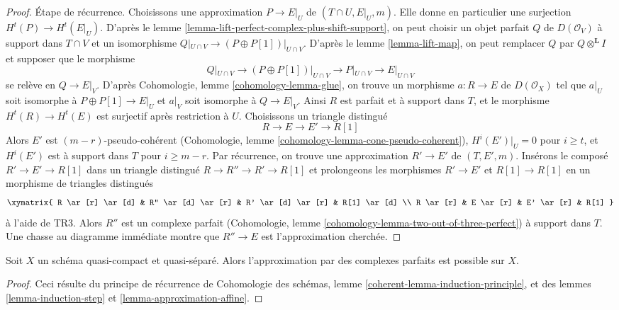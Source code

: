 \begin{proof}
\medskip\noindent
Étape de récurrence. Choisissons une approximation $P \to E|_U$
de $(T \cap U, E|_U, m)$. Elle donne en particulier une surjection
$H^t(P) \to H^t(E|_U)$. D'après le
lemme \ref{lemma-lift-perfect-complex-plus-shift-support},
on peut choisir un objet parfait $Q$ de $D(\mathcal{O}_V)$
à support dans $T \cap V$ et un isomorphisme
$Q|_{U \cap V} \to (P \oplus P[1])|_{U \cap V}$.
D'après le lemme \ref{lemma-lift-map}, on peut remplacer $Q$ par
$Q \otimes^\mathbf{L} I$
et supposer que le morphisme
$$
Q|_{U \cap V} \to (P \oplus P[1])|_{U \cap V}
\longrightarrow P|_{U \cap V}
\longrightarrow
E|_{U \cap V}
$$
se relève en $Q \to E|_V$. D'après
Cohomologie, lemme \ref{cohomology-lemma-glue},
on trouve un morphisme $a : R \to E$ de $D(\mathcal{O}_X)$
tel que $a|_U$ soit isomorphe à $P \oplus P[1] \to E|_U$
et $a|_V$ soit isomorphe à $Q \to E|_V$.
Ainsi $R$ est parfait et à support dans $T$,
et le morphisme $H^t(R) \to H^t(E)$ est surjectif après restriction à $U$.
Choisissons un triangle distingué
$$
R \to E \to E' \to R[1]
$$
Alors $E'$ est $(m - r)$-pseudo-cohérent
(Cohomologie, lemme \ref{cohomology-lemma-cone-pseudo-coherent}),
$H^i(E')|_U = 0$ pour $i \geq t$, et
$H^i(E')$ est à support dans $T$ pour $i \geq m - r$.
Par récurrence, on trouve une approximation $R' \to E'$
de $(T, E', m)$. Insérons le composé $R' \to E' \to R[1]$
dans un triangle distingué $R \to R'' \to R' \to R[1]$
et prolongeons les morphismes $R' \to E'$ et $R[1] \to R[1]$ en
un morphisme de triangles distingués
$$
\xymatrix{
R \ar[r] \ar[d] & R'' \ar[d] \ar[r] & R' \ar[d] \ar[r] & R[1] \ar[d] \\
R \ar[r] &  E \ar[r] & E' \ar[r] & R[1]
}
$$
à l'aide de TR3. Alors $R''$ est un complexe parfait
(Cohomologie, lemme \ref{cohomology-lemma-two-out-of-three-perfect})
à support dans $T$.
Une chasse au diagramme immédiate montre que $R'' \to E$ est l'approximation
cherchée.
\end{proof}

\begin{theorem}
\label{theorem-approximation}
Soit $X$ un schéma quasi-compact et quasi-séparé.
Alors l'approximation par des complexes parfaits est possible sur $X$.
\end{theorem}

\begin{proof}
Ceci résulte du principe de récurrence de
Cohomologie des schémas, lemme \ref{coherent-lemma-induction-principle},
et des lemmes \ref{lemma-induction-step} et \ref{lemma-approximation-affine}.
\end{proof}





